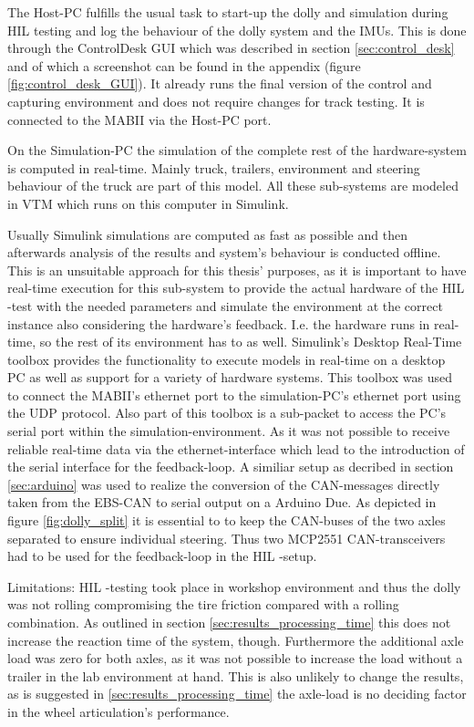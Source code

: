 \documentclass[ExampleMasters.tex]{subfiles}
\begin{document}
The Host-PC fulfills the usual task to start-up the dolly and simulation during \gls{HIL}  testing and log the behaviour of the dolly system and the \gls{IMU}s. This is done through the ControlDesk GUI which was described in section \ref{sec:control_desk} and of which a screenshot can be found in the appendix (figure \ref{fig:control_desk_GUI}). It already runs the final version of the control and capturing environment and does not require changes for track testing. It is connected to the \gls{MABII} via the Host-PC port.

On the Simulation-PC the simulation of the complete rest of the hardware-system is computed in real-time. Mainly truck, trailers, environment and steering behaviour of the truck are part of this model. All these sub-systems are modeled in \gls{VTM}  which runs on this computer in Simulink. 

Usually Simulink simulations are computed as fast as possible and then afterwards analysis of the results and system's behaviour is conducted offline. This is an unsuitable approach for this thesis' purposes, as it is important to have real-time execution for this sub-system to provide the actual hardware of the \gls{HIL} -test with the needed parameters and simulate the environment at the correct instance also considering the hardware's feedback. I.e. the hardware runs in real-time, so the rest of its environment has to as well. Simulink's Desktop Real-Time toolbox provides the functionality to execute models in real-time on a desktop PC as well as support for a variety of hardware systems. This toolbox was used to connect the MABII's ethernet port to the simulation-PC's ethernet port using the \gls{UDP} protocol. Also part of this toolbox is a sub-packet to access the PC's serial port within the simulation-environment. As it was not possible to receive reliable real-time data via the ethernet-interface which lead to the introduction of the serial interface for the feedback-loop. A similiar setup as decribed in section \ref{sec:arduino} was used to realize the conversion of the CAN-messages directly taken from the \gls{EBS}-\gls{CAN} to serial output on a Arduino Due. As depicted in figure \ref{fig:dolly_split} it is essential to to keep the CAN-buses of the two axles separated to ensure individual steering. Thus two MCP2551 \gls{CAN}-transceivers had to be used for the feedback-loop in the \gls{HIL} -setup.

Limitations: \gls{HIL} -testing took place in workshop environment and thus the dolly was not rolling compromising the tire friction compared with a rolling combination. As outlined in section \ref{sec:results_processing_time} this does not increase the reaction time of the system, though. Furthermore the additional axle load was zero for both axles, as it was not possible to increase the load without a trailer in the lab environment at hand. This is also unlikely to change the results, as is suggested in \ref{sec:results_processing_time} the axle-load is no deciding factor in the wheel articulation's performance. 
\end{document}
